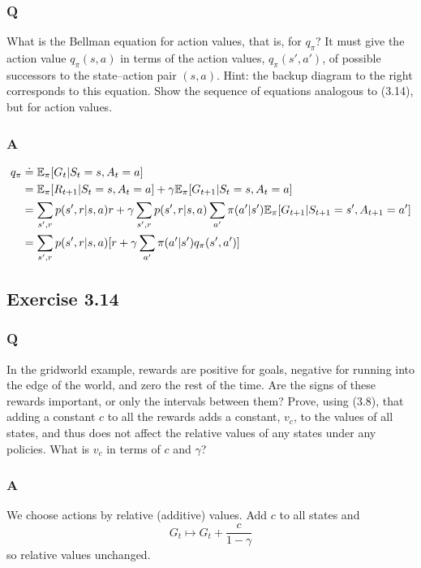 \subsubsection{Q}
What is the Bellman equation for action values, that is, for $q_\pi$? It must give the action value $q_\pi(s, a)$ in terms of the action values, $q_\pi(s',a')$, of possible successors to the state–action pair $(s,a)$. Hint: the backup diagram to the right corresponds to this equation. Show the sequence of equations analogous to (3.14), but for action values.

\subsubsection{A}
\begin{align*}
    q_\pi &\doteq \mathbb{E}_\pi[G_t | S_t=s, A_t=a]\\
          &= \mathbb{E}_\pi[R_{t+1}| S_t=s, A_t=a] + \gamma \mathbb{E}_\pi[G_{t+1} |S_t = s, A_t = a] \\
          &= \sum_{s', r} p(s', r|s, a)r + \gamma \sum_{s', r} p(s', r|s, a) \sum_{a'}\pi(a'|s')\mathbb{E}_\pi[G_{t+1}| S_{t+1}=s', A_{t+1}=a'] \\
          &= \sum_{s', r} p(s', r| s, a) [r + \gamma \sum_{a'}\pi(a'|s')q_\pi(s', a')]
\end{align*}


\subsection{Exercise 3.14}
\subsubsection{Q}
In the gridworld example, rewards are positive for goals, negative for running into the edge of the world, and zero the rest of the time. Are the signs of these rewards important, or only the intervals between them? Prove, using (3.8), that adding a constant $c$ to all the rewards adds a constant, $v_c$, to the values of all states, and thus does not affect the relative values of any states under any policies. What is $v_c$ in terms of $c$ and $\gamma$?

\subsubsection{A}
We choose actions by relative (additive) values. Add $c$ to all states and 
\begin{equation}
    G_t \mapsto G_t + \frac{c}{1 - \gamma}
\end{equation}
so relative values unchanged.\\


